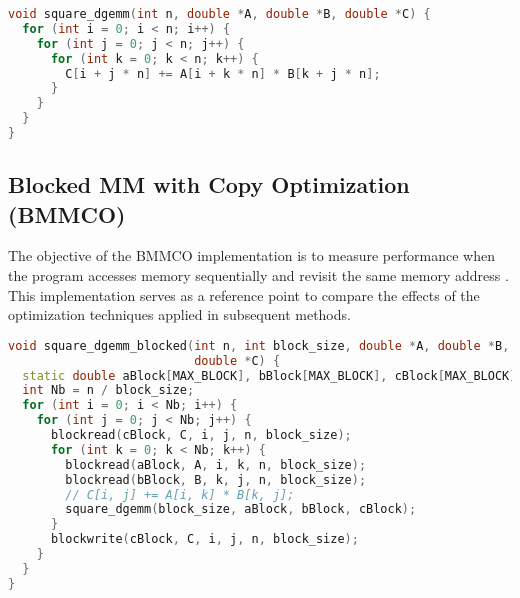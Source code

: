 \begin{lstlisting}[caption={Basic Multiplication},label={listing:basic}, name=basic, float=htbp, style=mystyle,language=C++]
void square_dgemm(int n, double *A, double *B, double *C) {
  for (int i = 0; i < n; i++) {
    for (int j = 0; j < n; j++) {
      for (int k = 0; k < n; k++) {
        C[i + j * n] += A[i + k * n] * B[k + j * n];
      }
    }
  }
}
\end{lstlisting}


\subsection{Blocked MM with Copy Optimization (BMMCO)}
The objective of the BMMCO implementation is to measure performance when the program accesses memory sequentially and revisit the same memory address . This implementation serves as a reference point to compare the effects of the optimization techniques applied in subsequent methods.



\begin{lstlisting}[caption={BMMCO Multiplication},label={listing:BMMCO}, name=BMMCO, float=htbp, style=mystyle,language=C++]
void square_dgemm_blocked(int n, int block_size, double *A, double *B,
                          double *C) {
  static double aBlock[MAX_BLOCK], bBlock[MAX_BLOCK], cBlock[MAX_BLOCK];
  int Nb = n / block_size;
  for (int i = 0; i < Nb; i++) {
    for (int j = 0; j < Nb; j++) {
      blockread(cBlock, C, i, j, n, block_size);
      for (int k = 0; k < Nb; k++) {
        blockread(aBlock, A, i, k, n, block_size);
        blockread(bBlock, B, k, j, n, block_size);
        // C[i, j] += A[i, k] * B[k, j];
        square_dgemm(block_size, aBlock, bBlock, cBlock);
      }
      blockwrite(cBlock, C, i, j, n, block_size);
    }
  }
}
\end{lstlisting}

